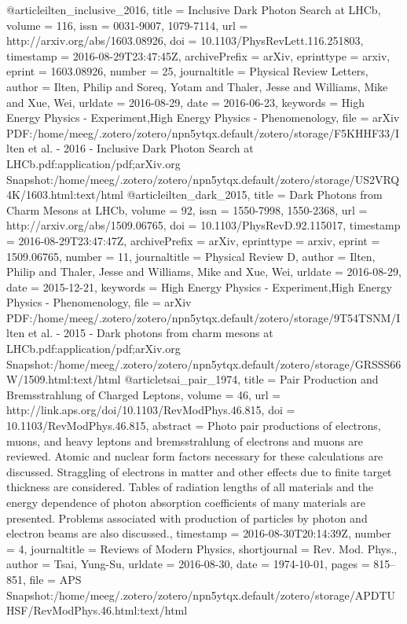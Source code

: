 @article{ilten_inclusive_2016,
  title = {Inclusive {{Dark Photon Search}} at {{LHCb}}},
  volume = {116},
  issn = {0031-9007, 1079-7114},
  url = {http://arxiv.org/abs/1603.08926},
  doi = {10.1103/PhysRevLett.116.251803},
  timestamp = {2016-08-29T23:47:45Z},
  archivePrefix = {arXiv},
  eprinttype = {arxiv},
  eprint = {1603.08926},
  number = {25},
  journaltitle = {Physical Review Letters},
  author = {Ilten, Philip and Soreq, Yotam and Thaler, Jesse and Williams, Mike and Xue, Wei},
  urldate = {2016-08-29},
  date = {2016-06-23},
  keywords = {High Energy Physics - Experiment,High Energy Physics - Phenomenology},
  file = {arXiv PDF:/home/meeg/.zotero/zotero/npn5ytqx.default/zotero/storage/F5KHHF33/Ilten et al. - 2016 - Inclusive Dark Photon Search at LHCb.pdf:application/pdf;arXiv.org Snapshot:/home/meeg/.zotero/zotero/npn5ytqx.default/zotero/storage/US2VRQ4K/1603.html:text/html}
}
@article{ilten_dark_2015,
  title = {Dark Photons from Charm Mesons at {{LHCb}}},
  volume = {92},
  issn = {1550-7998, 1550-2368},
  url = {http://arxiv.org/abs/1509.06765},
  doi = {10.1103/PhysRevD.92.115017},
  timestamp = {2016-08-29T23:47:47Z},
  archivePrefix = {arXiv},
  eprinttype = {arxiv},
  eprint = {1509.06765},
  number = {11},
  journaltitle = {Physical Review D},
  author = {Ilten, Philip and Thaler, Jesse and Williams, Mike and Xue, Wei},
  urldate = {2016-08-29},
  date = {2015-12-21},
  keywords = {High Energy Physics - Experiment,High Energy Physics - Phenomenology},
  file = {arXiv PDF:/home/meeg/.zotero/zotero/npn5ytqx.default/zotero/storage/9T54TSNM/Ilten et al. - 2015 - Dark photons from charm mesons at LHCb.pdf:application/pdf;arXiv.org Snapshot:/home/meeg/.zotero/zotero/npn5ytqx.default/zotero/storage/GRSSS66W/1509.html:text/html}
}
@article{tsai_pair_1974,
  title = {Pair Production and Bremsstrahlung of Charged Leptons},
  volume = {46},
  url = {http://link.aps.org/doi/10.1103/RevModPhys.46.815},
  doi = {10.1103/RevModPhys.46.815},
  abstract = {Photo pair productions of electrons, muons, and heavy leptons and bremsstrahlung of electrons and muons are reviewed. Atomic and nuclear form factors necessary for these calculations are discussed. Straggling of electrons in matter and other effects due to finite target thickness are considered. Tables of radiation lengths of all materials and the energy dependence of photon absorption coefficients of many materials are presented. Problems associated with production of particles by photon and electron beams are also discussed.},
  timestamp = {2016-08-30T20:14:39Z},
  number = {4},
  journaltitle = {Reviews of Modern Physics},
  shortjournal = {Rev. Mod. Phys.},
  author = {Tsai, Yung-Su},
  urldate = {2016-08-30},
  date = {1974-10-01},
  pages = {815--851},
  file = {APS Snapshot:/home/meeg/.zotero/zotero/npn5ytqx.default/zotero/storage/APDTUHSF/RevModPhys.46.html:text/html}
}
